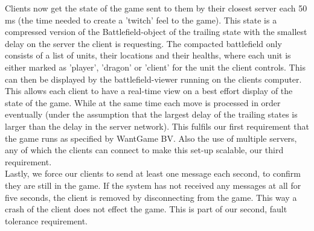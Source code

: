 Clients now get the state of the game sent to them by their closest server each 50 ms (the time needed to create a 'twitch' feel to the game). This state is a compressed version of the Battlefield-object of the trailing state with the smallest delay on the server the client is requesting. The compacted battlefield only consists of a list of units, their locations and their healths, where each unit is either marked as 'player', 'dragon' or 'client' for the unit the client controls. This can then be displayed by the battlefield-viewer running on the clients computer.\\
This allows each client to have a real-time view on a best effort display of the state of the game. While at the same time each move is processed in order eventually (under the assumption that the largest delay of the trailing states is larger than the delay in the server network). This fulfils our first requirement that the game runs as specified by WantGame BV. Also the use of multiple servers, any of which the clients can connect to make this set-up scalable, our third requirement.\\
Lastly, we force our clients to send at least one message each second, to confirm they are still in the game. If the system has not received any messages at all for five seconds, the client is removed by disconnecting from the game. This way a crash of the client does not effect the game. This is part of our second, fault tolerance requirement.\\
